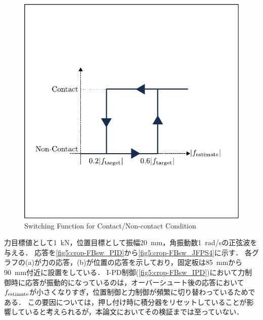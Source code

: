 \begin{figure}[t]
    \centering
        \includegraphics[keepaspectratio, scale=1.0]{contents/IntegrationControl/figure/touch_define.pdf}
        \caption{Switching Function for Contact/Non-contact Condition}
        \label{fig5:touch_define}
\end{figure}

力目標値として\SI{1}{kN}，位置目標として振幅\SI{20}{mm}，角振動数\SI{1}{rad/s}の正弦波を与える．
応答を\figname\ref{fig5:crop-FBsw_PID}から\figname\ref{fig5:crop-FBsw_JFPS4}に示す．
各グラフの(a)が力の応答，(b)が位置の応答を示しており，固定板は\SI{85}{mm}から\SI{90}{mm}付近に設置をしている．
I-PD制御(\figname\ref{fig5:crop-FBsw_IPD})において力制御時に応答が振動的になっているのは，オーバーシュート後の応答において$f_\mathrm{estimate}$が小さくなりすぎ，位置制御と力制御が頻繁に切り替わっているためである．
この要因については，押し付け時に積分器をリセットしていることが影響していると考えられるが，本論文においてその検証までは至っていない．

